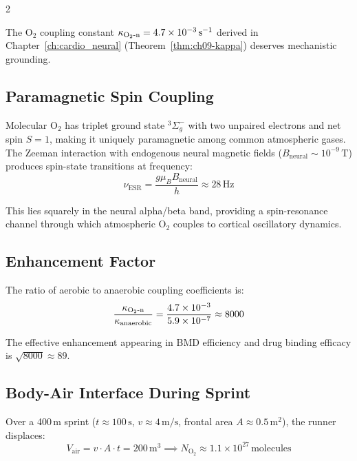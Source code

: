 \begin{multicols}{2}

The O$_2$ coupling constant $\kappa_{\mathrm{O_2\text{-}n}} = 4.7\times10^{-3}\,\mathrm{s}^{-1}$ derived in Chapter~\ref{ch:cardio_neural} (Theorem~\ref{thm:ch09-kappa}) deserves mechanistic grounding.

\subsection{Paramagnetic Spin Coupling}

Molecular O$_2$ has triplet ground state $^3\Sigma_g^-$ with two unpaired electrons and net spin $S = 1$, making it uniquely paramagnetic among common atmospheric gases. The Zeeman interaction with endogenous neural magnetic fields ($B_{\mathrm{neural}} \sim 10^{-9}\,\mathrm{T}$) produces spin-state transitions at frequency:
\begin{equation}
\nu_{\mathrm{ESR}} = \frac{g\mu_B B_{\mathrm{neural}}}{h} \approx 28\,\mathrm{Hz}
\end{equation}

This lies squarely in the neural alpha/beta band, providing a spin-resonance channel through which atmospheric O$_2$ couples to cortical oscillatory dynamics.

\subsection{Enhancement Factor}

The ratio of aerobic to anaerobic coupling coefficients is:
\begin{equation}
\frac{\kappa_{\mathrm{O_2\text{-}n}}}{\kappa_{\mathrm{anaerobic}}} = \frac{4.7\times10^{-3}}{5.9\times10^{-7}} \approx 8000
\end{equation}

The effective enhancement appearing in BMD efficiency and drug binding efficacy is $\sqrt{8000} \approx 89$.

\subsection{Body-Air Interface During Sprint}

Over a 400\,m sprint ($t \approx 100\,\mathrm{s}$, $v \approx 4\,\mathrm{m/s}$, frontal area $A \approx 0.5\,\mathrm{m}^2$), the runner displaces:
\begin{equation}
V_{\mathrm{air}} = v \cdot A \cdot t = 200\,\mathrm{m}^3 \implies N_{\mathrm{O_2}} \approx 1.1\times10^{27}\,\mathrm{molecules}
\end{equation}


\end{multicols}

